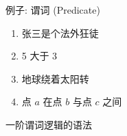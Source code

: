 
\begin{frame}{}
  \begin{exampleblock}{例子: 谓词 (Predicate)}
    \begin{enumerate}[<+->][(1)]
      \setlength{\itemsep}{6pt}
      \item 张三是个法外狂徒
      \item 5 大于 3
      \item 地球绕着太阳转
      \item 点 $a$ 在点 $b$ 与点 $c$ 之间
    \end{enumerate}
  \end{exampleblock}

  \vspace{0.30cm}
\end{frame}

\begin{frame}{}
  \begin{center}
    一阶谓词逻辑的语法

  \end{center}
\end{frame}

